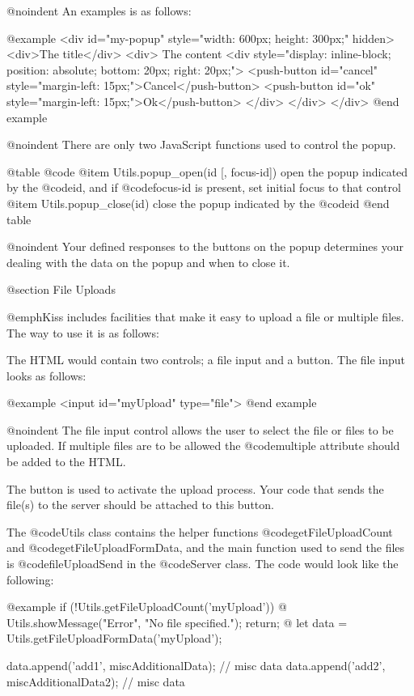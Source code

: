 @noindent
An examples is as follows:

@example
<div id="my-popup" style="width: 600px; height: 300px;" hidden>
    <div>The title</div>
    <div>
        The content
        <div style="display: inline-block; position: absolute; bottom: 20px; right: 20px;">
            <push-button id="cancel" style="margin-left: 15px;">Cancel</push-button>
            <push-button id="ok" style="margin-left: 15px;">Ok</push-button>
        </div>
    </div>
</div>
@end example

@noindent
There are only two JavaScript functions used to control the popup.

@table @code
@item Utils.popup_open(id [, focus-id])
open the popup indicated by the @code{id}, and if @code{focus-id} is present, set initial focus to that control
@item Utils.popup_close(id)
close the popup indicated by the @code{id}
@end table

@noindent
Your defined responses to the buttons on the popup determines your dealing with the
data on the popup and when to close it.

@section File Uploads

@emph{Kiss} includes facilities that make it easy to upload a file or
multiple files.  The way to use it is as follows:

The HTML would contain two controls; a file input and a button.  The file
input looks as follows:

@example
<input id="myUpload" type="file">
@end example

@noindent
The file input control allows the user to select the file or files to
be uploaded.  If multiple files are to be allowed the @code{multiple}
attribute should be added to the HTML.

The button is used to activate the upload process.  Your code that
sends the file(s) to the server should be attached to this button.

The @code{Utils} class contains the helper functions @code{getFileUploadCount}
and @code{getFileUploadFormData}, and the main function used to
send the files is @code{fileUploadSend} in the @code{Server} class.
The code would look like the following:

@example
if (!Utils.getFileUploadCount('myUpload')) @{
    Utils.showMessage("Error", "No file specified.");
    return;
@}
let data = Utils.getFileUploadFormData('myUpload');

data.append('add1', miscAdditionalData);  // misc data
data.append('add2', miscAdditionalData2); // misc data

